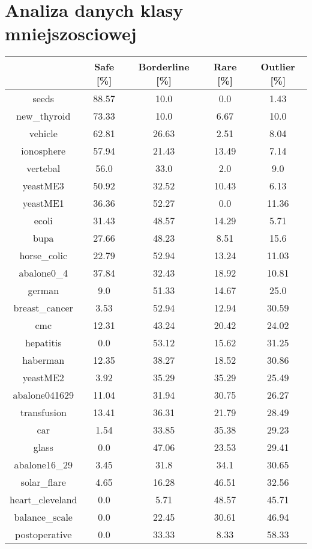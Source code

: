 \documentclass{article}%
\begin{document}
%
\normalsize%
\section*{Analiza danych klasy mniejszosciowej}%
\begin{tabular}{c|cccc}%
&Safe [\%]&Borderline [\%]&Rare [\%]&Outlier [\%]\\%
\hline%
seeds&88.57&10.0&0.0&1.43\\%
new\_thyroid&73.33&10.0&6.67&10.0\\%
vehicle&62.81&26.63&2.51&8.04\\%
ionosphere&57.94&21.43&13.49&7.14\\%
vertebal&56.0&33.0&2.0&9.0\\%
yeastME3&50.92&32.52&10.43&6.13\\%
yeastME1&36.36&52.27&0.0&11.36\\%
ecoli&31.43&48.57&14.29&5.71\\%
bupa&27.66&48.23&8.51&15.6\\%
horse\_colic&22.79&52.94&13.24&11.03\\%
abalone0\_4&37.84&32.43&18.92&10.81\\%
german&9.0&51.33&14.67&25.0\\%
breast\_cancer&3.53&52.94&12.94&30.59\\%
cmc&12.31&43.24&20.42&24.02\\%
hepatitis&0.0&53.12&15.62&31.25\\%
haberman&12.35&38.27&18.52&30.86\\%
yeastME2&3.92&35.29&35.29&25.49\\%
abalone041629&11.04&31.94&30.75&26.27\\%
transfusion&13.41&36.31&21.79&28.49\\%
car&1.54&33.85&35.38&29.23\\%
glass&0.0&47.06&23.53&29.41\\%
abalone16\_29&3.45&31.8&34.1&30.65\\%
solar\_flare&4.65&16.28&46.51&32.56\\%
heart\_cleveland&0.0&5.71&48.57&45.71\\%
balance\_scale&0.0&22.45&30.61&46.94\\%
postoperative&0.0&33.33&8.33&58.33\\%
\end{tabular}

%
\end{document}
